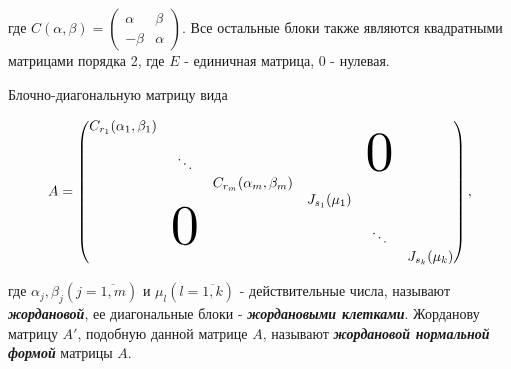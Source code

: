 где $C(\alpha, \beta) = \begin{pmatrix} 
    \alpha & \beta \\
    -\beta & \alpha
\end{pmatrix}$. Все остальные блоки также являются квадратными матрицами порядка 2, где $E$ - единичная матрица, 0 - нулевая.

Блочно-диагональную матрицу вида

\[
A = \begin{pmatrix}
    C_{r_1}(\alpha_1, \beta_1) &        &        &        &  \\
                               & \ddots &        &        & \scaleobj{4}{0}   \\
                               &        & C_{r_m}(\alpha_m, \beta_m) &        &   \\
                               &        &        & J_{s_1}(\mu_1) &   \\
                               & \scaleobj{4}{0} &        &     & \ddots  &  \\
                               &        &        &        & &J_{s_k}(\mu_k)
\end{pmatrix},
\]

где $\alpha_j, \beta_j (j = \overline{1, m})$ и $\mu_l (l = \overline{1, k})$ - действительные числа, называют \textbf{\textit{жордановой}}, ее диагональные блоки - \textbf{\textit{жордановыми клетками}}. Жорданову матрицу $A'$, подобную данной матрице $A$, называют \textbf{\textit{жордановой нормальной формой}} матрицы $A$.
